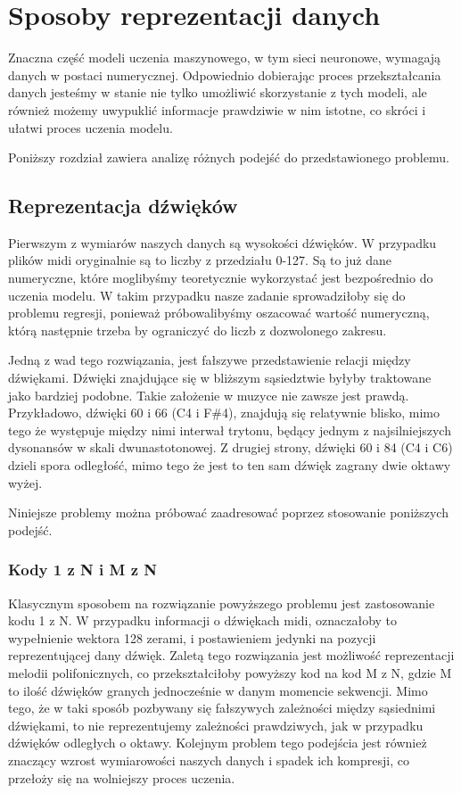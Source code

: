 \chapter{Sposoby reprezentacji danych}
{
    Znaczna część modeli uczenia maszynowego, w tym sieci neuronowe, wymagają 
    danych w postaci numerycznej. Odpowiednio dobierając proces przekształcania danych
    jesteśmy w stanie nie tylko umożliwić skorzystanie z tych modeli, ale również możemy 
    uwypuklić informacje prawdziwie w nim istotne, co skróci i ułatwi proces uczenia modelu.

    Poniższy rozdział zawiera analizę różnych podejść do przedstawionego problemu.

    \section{Reprezentacja dźwięków}
    {
        Pierwszym z wymiarów naszych danych są wysokości dźwięków. W przypadku plików midi
        oryginalnie są to liczby z przedziału 0-127. Są to już dane numeryczne, które
        moglibyśmy teoretycznie wykorzystać jest bezpośrednio do uczenia modelu.
        W takim przypadku nasze zadanie sprowadziłoby się do problemu regresji, ponieważ próbowalibyśmy
        oszacować wartość numeryczną, którą następnie trzeba by ograniczyć do liczb z dozwolonego zakresu.

        Jedną z wad tego rozwiązania, jest fałszywe przedstawienie relacji między dźwiękami.
        Dźwięki znajdujące się w bliższym sąsiedztwie byłyby traktowane jako bardziej podobne.
        Takie założenie w muzyce nie zawsze jest prawdą. Przykładowo, dźwięki 60 i 66 (C4 i F\#4), znajdują się
        relatywnie blisko, mimo tego że występuje między nimi interwał trytonu, będący jednym z najsilniejszych dysonansów w skali 
        dwunastotonowej. Z drugiej strony, dźwięki 60 i 84 (C4 i C6) dzieli spora odległość, mimo tego że jest to ten sam dźwięk
        zagrany dwie oktawy wyżej.

        Niniejsze problemy można próbować zaadresować poprzez stosowanie poniższych podejść.

        \subsection{Kody 1 z N i M z N}
        {
            Klasycznym sposobem na rozwiązanie powyższego problemu jest zastosowanie kodu 1 z N. W przypadku
            informacji o dźwiękach midi, oznaczałoby to wypełnienie wektora 128 zerami, i postawieniem jedynki na 
            pozycji reprezentującej dany dźwięk. 
            Zaletą tego rozwiązania jest możliwość reprezentacji melodii polifonicznych, co przekształciłoby
            powyższy kod na kod M z N, gdzie M to ilość dźwięków granych jednocześnie w danym momencie sekwencji.
            Mimo tego, że w taki sposób pozbywany się fałszywych zależności między sąsiednimi dźwiękami, 
            to nie reprezentujemy zależności prawdziwych, jak w przypadku dźwięków odległych o oktawy. 
            Kolejnym problem tego podejścia jest również znaczący wzrost wymiarowości naszych danych i spadek ich kompresji,
            co przełoży się na wolniejszy proces uczenia.
        }

}}
